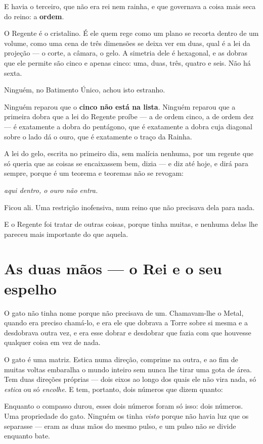 \documentclass[livro.tex]{subfiles}
\begin{document}
E havia o terceiro, que não era rei nem rainha, e que governava a coisa mais seca do reino: a \textbf{ordem}.

O Regente é o cristalino. É ele quem rege como um plano se recorta dentro de um volume, como uma cena de três
dimensões se deixa ver em duas, qual é a lei da projeção --- o corte, a câmara, o gelo. A simetria dele é
hexagonal, e as dobras que ele permite são cinco e apenas cinco: uma, duas, três, quatro e seis. Não há sexta.

Ninguém, no Batimento Único, achou isto estranho.

Ninguém reparou que o \textbf{cinco não está na lista}. Ninguém reparou que a primeira dobra que a lei do Regente
proíbe --- a de ordem cinco, a de ordem dez --- é exatamente a dobra do pentágono, que é exatamente a dobra cuja
diagonal sobre o lado dá o ouro, que é exatamente o traço da Rainha.

A lei do gelo, escrita no primeiro dia, sem malícia nenhuma, por um regente que só queria que as coisas se
encaixassem bem, dizia --- e diz até hoje, e dirá para sempre, porque é um teorema e teoremas não se revogam:

\emph{aqui dentro, o ouro não entra.}

Ficou ali. Uma restrição inofensiva, num reino que não precisava dela para nada.

E o Regente foi tratar de outras coisas, porque tinha muitas, e nenhuma delas lhe pareceu mais importante do que
aquela.


\chapter{As duas mãos --- o Rei e o seu espelho}

O gato não tinha nome porque não precisava de um. Chamavam-lhe o Metal, quando era preciso chamá-lo, e era ele que
dobrava a Torre sobre si mesma e a desdobrava outra vez, e era esse dobrar e desdobrar que fazia com que houvesse
qualquer coisa em vez de nada.

O gato é uma matriz. Estica numa direção, comprime na outra, e ao fim de muitas voltas embaralha o mundo inteiro
sem nunca lhe tirar uma gota de área. Tem duas direções próprias --- dois eixos ao longo dos quais ele não vira
nada, só \emph{estica} ou só \emph{encolhe}. E tem, portanto, dois números que dizem quanto:

Enquanto o compasso durou, esses dois números foram só isso: dois números. Uma propriedade do gato. Ninguém os
tinha \emph{visto} porque não havia luz que os separasse --- eram as duas mãos do mesmo pulso, e um pulso não se
divide enquanto bate.
\end{document}
